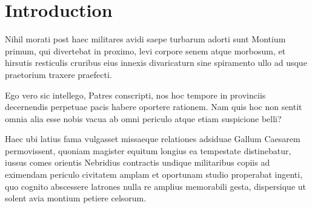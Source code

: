 
\chapter{Introduction}

Nihil morati post haec militares avidi saepe turbarum adorti sunt Montium primum, qui divertebat in proximo, levi corpore senem atque morbosum, et hirsutis resticulis cruribus eius innexis divaricaturn sine spiramento ullo ad usque praetorium traxere praefecti.

Ego vero sic intellego, Patres conscripti, nos hoc tempore in provinciis decernendis perpetuae pacis habere oportere rationem. Nam quis hoc non sentit omnia alia esse nobis vacua ab omni periculo atque etiam suspicione belli?

Haec ubi latius fama vulgasset missaeque relationes adsiduae Gallum Caesarem permovissent, quoniam magister equitum longius ea tempestate distinebatur, iussus comes orientis Nebridius contractis undique militaribus copiis ad eximendam periculo civitatem amplam et oportunam studio properabat ingenti, quo cognito abscessere latrones nulla re amplius memorabili gesta, dispersique ut solent avia montium petiere celsorum.
